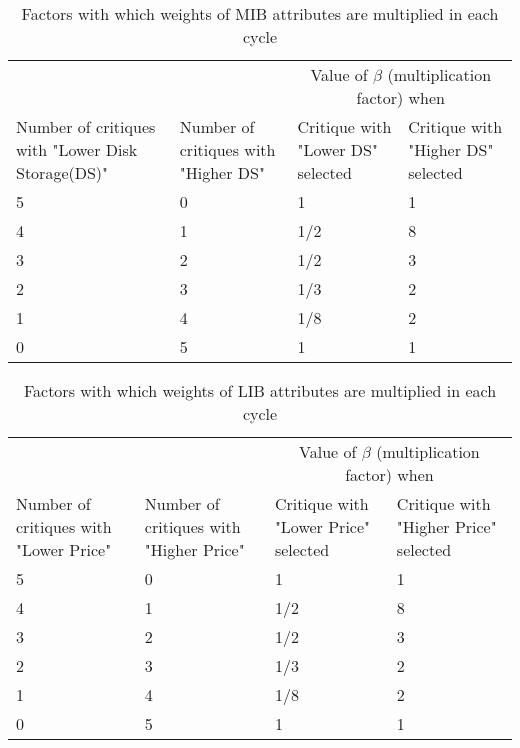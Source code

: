 \begin{table}[h]
\renewcommand{\arraystretch}{1.1}
 \centering
 \begin{tabular}{|p{3cm}| p{3cm}| p{3cm}| p{3cm}|}
 \cline{3-4}
 & &\multicolumn{2}{c|}{Value of $\beta$ (multiplication factor) when}\\
 \cline{3-4}

 \cline{1-4}
   Number of critiques with "Lower Disk Storage(DS)" &
   Number of critiques with "Higher DS" &
   Critique with "Lower DS" selected &
   Critique with "Higher DS" selected \\

  \cline{1-4}
  5 & 0 & 1  & 1 \\
  4 & 1 & 1/2  & 8 \\
  3 & 2 & 1/2  & 3 \\
  2 & 3 & 1/3  & 2 \\
  1 & 4 & 1/8  & 2 \\
  0 & 5 & 1  & 1 \\
  \cline{1-4} \hline
 \end{tabular}
 \caption{Factors with which weights of MIB attributes are multiplied in each cycle}
 \label{tab:selectiveWt}
\end{table}


\begin{table}[h]
\renewcommand{\arraystretch}{1.3}
 \centering
 \begin{tabular}{|p{3cm}| p{3cm}| p{3cm}| p{3cm}|}
 \cline{3-4}
 & &\multicolumn{2}{c|}{Value of $\beta$ (multiplication factor) when}\\
 \cline{3-4}

 \cline{1-4}
   Number of critiques with "Lower Price" &
   Number of critiques with "Higher Price" &
   Critique with "Lower Price" selected &
   Critique with "Higher Price" selected \\

  \cline{1-4}
  5 & 0 & 1  & 1 \\
  4 & 1 & 1/2  & 8 \\
  3 & 2 & 1/2  & 3 \\
  2 & 3 & 1/3  & 2 \\
  1 & 4 & 1/8  & 2 \\
  0 & 5 & 1  & 1 \\
  \cline{1-4} \hline
 \end{tabular}
 \caption{Factors with which weights of LIB attributes are multiplied in each cycle}
 \label{tab:selectiveWt2}
\end{table}
